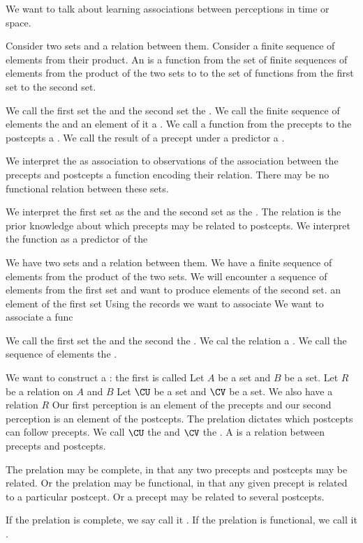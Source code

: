 
\sbasic






\sstart
{}


We want to talk about learning
associations between perceptions
in time or space.


Consider two sets
and a relation between them.
Consider a finite sequence of elements
from their product.
An  is a function
from the set of finite sequences of
elements from the product of the two
sets to to the set of functions from
the first set to the second set.

We call the first set the
 and the second
set the
.
We call the finite sequence of
elements the 
and an element of it a .
We call a function from the precepts
to the postcepts a .
We call the result of a precept
under a predictor a .

We interpret the  as
association to observations of the
association between the precepts
and postcepts a function encoding
their relation. There may be no
functional relation between these
sets.

We interpret the first set
as the 
and the second set as the
. The relation
is the prior knowledge about
which precepts may be related to
postcepts.
We interpret the function as a
predictor of the



We have two sets and a relation
between them.
We have a finite sequence of
elements from the product of
the two sets.
We will encounter a sequence of
elements from the first set
and want to produce elements of
the second set.
an element
of the first set
Using the records we want to
associate
We want to associate a func

We call the first set the
 and the second the
. We cal the relation
a .
We call the sequence of elements
the .

We want to construct a
: the
first is called
Let $A$ be a set and $B$
be a set. Let $R$ be a relation
on $A$ and $B$
Let $\CU$ be a set
and $\CV$ be a set.
We also have a relation $R$
Our first perception is an
element of the precepts and
our second perception is an
element of the postcepts.
The prelation dictates which
postcepts can follow precepts.
We call $\CU$ the
and $\CV$ the .
A  is
a relation between precepts
and postcepts.


The prelation may be
complete, in that any two precepts
and postcepts may be related.
Or the prelation may
be functional, in that any given
precept is related to a particular
postcept.
Or a precept may be related
to several postcepts.

If the prelation is complete, we say
call it .
If the prelation is functional, we call
it .
\strats
